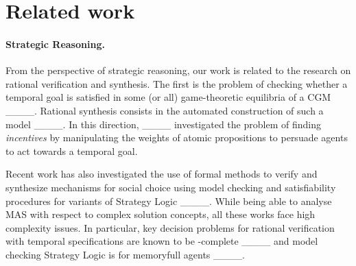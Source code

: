 \section{Related work }
\label{sec:related}


\paragraph*{Strategic Reasoning.}

From the perspective of strategic reasoning, our work is related to the research on rational verification and synthesis. The first is the problem of checking whether a temporal goal is 
satisfied in some (or all) game-theoretic equilibria of a CGM ____. Rational synthesis consists in the automated construction of such a model ____.  
In this direction, 
____ investigated the problem of finding \emph{incentives} by manipulating the weights of atomic propositions to persuade %
agents to act towards a temporal goal. %




Recent work has also investigated the use of formal methods to verify and synthesize mechanisms for social choice using model checking and satisfiability procedures for variants of Strategy Logic ____. 
While being able to analyse MAS with respect to complex solution concepts, all these works face high complexity issues. 
In particular, key decision problems for rational verification with temporal specifications are known to be \Dexptime-complete ____ and model checking  Strategy Logic is \NONELEMENTARY for memoryfull agents ____. 


